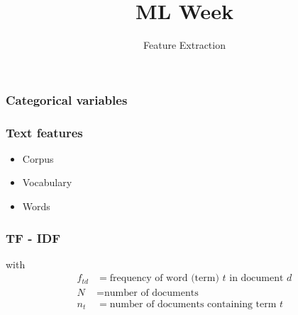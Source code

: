 
\title
{ML Week}
\subtitle{Feature Extraction}




\begin{frame}
  \titlepage
\end{frame}

\begin{frame}
  \frametitle{Categorical variables}

\end{frame}

\begin{frame}[t]

\end{frame}

\begin{frame}
  \frametitle{Text features}
  \begin{itemize}
  \item Corpus
  \item Vocabulary
  \item Words
  \end{itemize}
\end{frame}

\begin{frame}
\end{frame}

\begin{frame}
  \frametitle{TF - IDF}
  
  with
  \begin{align*}
    f_{td} &= \mbox{frequency of word (term) $t$ in document $d$} \\
    N &= \mbox{number of documents}\\
    n_t &= \mbox{number of documents containing term $t$}
  \end{align*}
\end{frame}

